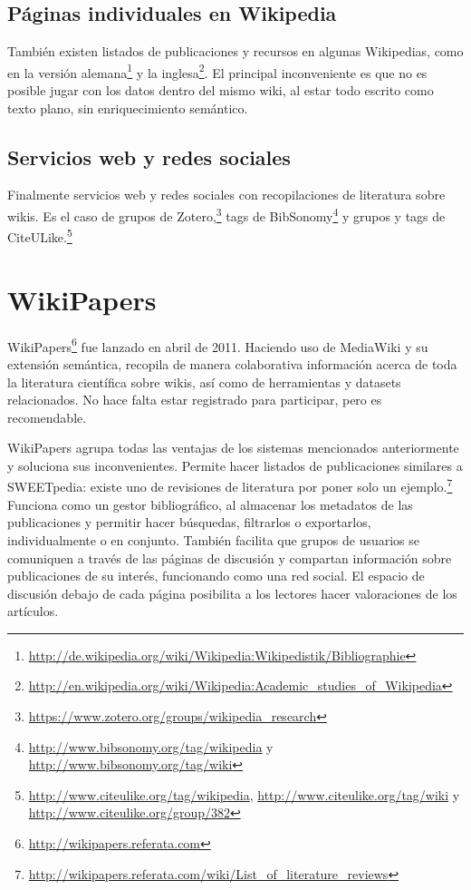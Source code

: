 \documentclass[11pt,twocolumn]{article}
\begin{document}
\subsection{Páginas individuales en Wikipedia}
También existen listados de publicaciones y recursos en algunas Wikipedias, como en la versión alemana\footnote{\href{http://de.wikipedia.org/wiki/Wikipedia:Wikipedistik/Bibliographie}{http://de.wikipedia.org/wiki/Wikipedia:Wikipedistik/Bibliographie}} y la inglesa\footnote{\href{http://en.wikipedia.org/wiki/Wikipedia:Academic_studies_of_Wikipedia}{http://en.wikipedia.org/wiki/Wikipedia:Academic\_studies\_of\_Wikipedia}}. El principal inconveniente es que no es posible jugar con los datos dentro del mismo wiki, al estar todo escrito como texto plano, sin enriquecimiento semántico.

\subsection{Servicios web y redes sociales}
Finalmente servicios web y redes sociales con recopilaciones de literatura sobre wikis. Es el caso de grupos de Zotero,\footnote{\href{https://www.zotero.org/groups/wikipedia_research}{https://www.zotero.org/groups/wikipedia\_research}} tags de BibSonomy\footnote{\href{http://www.bibsonomy.org/tag/wikipedia}{http://www.bibsonomy.org/tag/wikipedia} y \href{http://www.bibsonomy.org/tag/wiki}{http://www.bibsonomy.org/tag/wiki}} y grupos y tags de CiteULike.\footnote{\href{http://www.citeulike.org/tag/wikipedia}{http://www.citeulike.org/tag/wikipedia}, \href{http://www.citeulike.org/tag/wiki}{http://www.citeulike.org/tag/wiki} y \href{http://www.citeulike.org/group/382}{http://www.citeulike.org/group/382}}

\section{WikiPapers}
WikiPapers\footnote{\href{http://wikipapers.referata.com}{http://wikipapers.referata.com}} fue lanzado en abril de 2011. Haciendo uso de MediaWiki y su extensión semántica, recopila de manera colaborativa información acerca de toda la literatura científica sobre wikis, así como de herramientas y datasets relacionados. No hace falta estar registrado para participar, pero es recomendable.

WikiPapers agrupa todas las ventajas de los sistemas mencionados anteriormente y soluciona sus inconvenientes. Permite hacer listados de publicaciones similares a SWEETpedia: existe uno de revisiones de literatura por poner solo un ejemplo.\footnote{\href{http://wikipapers.referata.com/wiki/List_of_literature_reviews}{http://wikipapers.referata.com/wiki/List\_of\_literature\_reviews}} Funciona como un gestor bibliográfico, al almacenar los metadatos de las publicaciones y permitir hacer búsquedas, filtrarlos o exportarlos, individualmente o en conjunto. También facilita que grupos de usuarios se comuniquen a través de las páginas de discusión y compartan información sobre publicaciones de su interés, funcionando como una red social. El espacio de discusión debajo de cada página posibilita a los lectores hacer valoraciones de los artículos.
\end{document}
